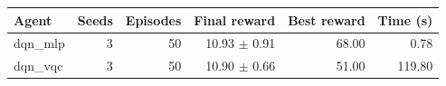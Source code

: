 \begin{tabular}{lrrrrr}
\hline
Agent & Seeds & Episodes & Final reward & Best reward & Time (s) \\
\hline
dqn_mlp & 3 & 50 & 10.93 $\pm$ 0.91 & 68.00 & 0.78 \\
dqn_vqc & 3 & 50 & 10.90 $\pm$ 0.66 & 51.00 & 119.80 \\
\hline
\end{tabular}
